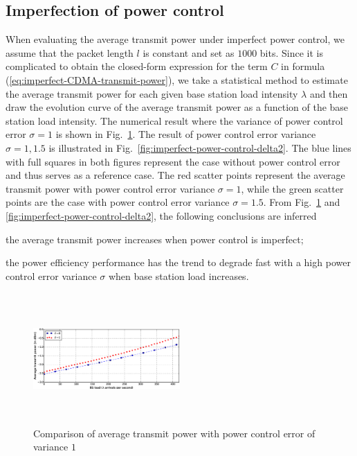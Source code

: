 \subsection{Imperfection of power control}
When evaluating the average transmit power under imperfect power control, we assume that the packet length $l$ is constant and set as $1000$ bits. Since it is complicated to obtain the closed-form expression for the term $C$ in formula (\ref{eq:imperfect-CDMA-transmit-power}), we take a statistical method to estimate the average transmit power for each given base station load intensity $\lambda$ and then draw the evolution curve of the average transmit power as a function of the base station load intensity. 
The numerical result where the variance of power control error $\sigma = 1$ is shown in Fig.~\ref{fig:imperfect-power-control-delta1}. The result of power control error variance $\sigma=1, 1.5$ is illustrated in Fig.~\ref{fig:imperfect-power-control-delta2}. 
The blue lines with full squares in both figures represent the case without power control error and thus serves as a reference case. The red scatter points represent the average transmit power with power control error variance $\sigma=1$, while the green scatter points are the case with power control error variance $\sigma=1.5$. From Fig.~\ref{fig:imperfect-power-control-delta1} and \ref{fig:imperfect-power-control-delta2}, the following conclusions are inferred \begin{inparaenum}[i)]
	\item the average transmit power increases when power control is imperfect;
	\item the power efficiency performance has the trend to degrade fast with a high power control error variance $\sigma$ when base station load increases.
\end{inparaenum}
\begin{figure}[!tb]
	\centering
	\includegraphics[width=0.5\textwidth, height=5cm]{Chapter3/Figures/Imperfect-power-control-CDMA-delta1-2015-1011}
	\caption{Comparison of average transmit power with power control error of variance $1$ }
	\label{fig:imperfect-power-control-delta1}
\end{figure}
